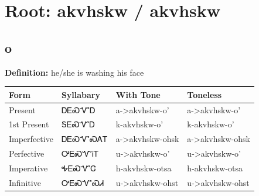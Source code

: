 \documentclass{article}%
\begin{document}
%
\normalsize%
\section*{Root: akvhskw / akvhskw}%
\subsection*{o}%
\textbf{Definition: }%
he/she is washing his face%
\\[0.5em]%
\begin{tabular}{|l|l|l|l|}%
\hline%
\textbf{Form}&\textbf{Syllabary}&\textbf{With Tone}&\textbf{Toneless}\\%
\hline%
Present&ᎠᎬᏍᏉᎠ&a{-}>akvhskw{-}o'&a{-}>akvhskw{-}o'\\%
1st Present&ᎦᎬᏍᏉᎠ&k{-}akvhskw{-}o'&k{-}akvhskw{-}o'\\%
Imperfective&ᎠᎬᏍᏉᏍᎪᎢ&a{-}>akvhskw{-}ohsk&a{-}>akvhskw{-}ohsk\\%
Perfective&ᎤᎬᏍᏉᎥᎢ&u{-}>akvhskw{-}o'&u{-}>akvhskw{-}o'\\%
Imperative&ᎭᎬᏍᏉᏣ&h{-}akvhskw{-}otsa&h{-}akvhskw{-}otsa\\%
Infinitive&ᎤᎬᏍᏉᏍᏗ&u{-}>akvhskw{-}ohst&u{-}>akvhskw{-}ohst\\%
\hline%
\end{tabular}%
\\[1em]%
\end{document}
